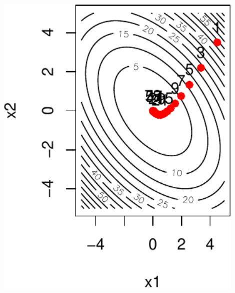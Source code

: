 \documentclass[12pt]{beamer}
\begin{document}
\begin{frame}
\begin{center}
\begin{minipage}[b]{0.3\textwidth}
\includegraphics[width=0.9\textwidth]{gradient_quad_2d_x_alpha01-crop.pdf} 
\end{minipage}
\end{center}
\end{frame}
\end{document}
